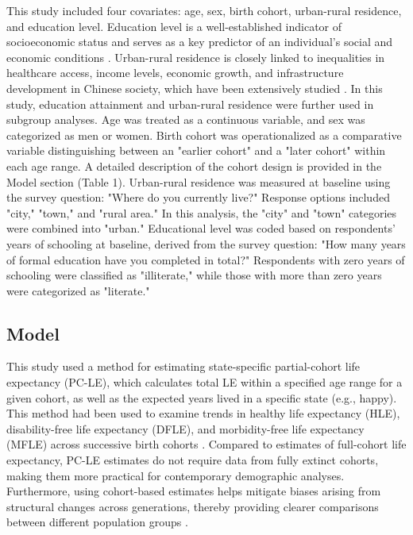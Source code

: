 \documentclass[12pt, a4paper]{article}
\begin{document}
This study included four covariates: age, sex, birth cohort, urban-rural residence, and education level. Education level is a well-established indicator of socioeconomic status and serves as a key predictor of an individual's social and economic conditions \autocite{kwok.2001.use}. Urban-rural residence is closely linked to inequalities in healthcare access, income levels, economic growth, and infrastructure development in Chinese society, which have been extensively studied \autocite{liu.2019.are}. In this study, education attainment and urban-rural residence were further used in subgroup analyses. Age was treated as a continuous variable, and sex was categorized as men or women. Birth cohort was operationalized as a comparative variable distinguishing between an "earlier cohort" and a "later cohort" within each age range. A detailed description of the cohort design is provided in the Model section (Table 1). Urban-rural residence was measured at baseline using the survey question: "Where do you currently live?" Response options included "city," "town," and "rural area." In this analysis, the "city" and "town" categories were combined into "urban." Educational level was coded based on respondents' years of schooling at baseline, derived from the survey question: "How many years of formal education have you completed in total?" Respondents with zero years of schooling were classified as "illiterate," while those with more than zero years were categorized as "literate."

\subsection{Model}
This study used a method for estimating state-specific partial-cohort life expectancy (PC-LE), which calculates total LE within a specified age range for a given cohort, as well as the expected years lived in a specific state (e.g., happy). This method had been used to examine trends in healthy life expectancy (HLE), disability-free life expectancy (DFLE), and morbidity-free life expectancy (MFLE) across successive birth cohorts \autocite{liu.2019.are,payne.2022.expansion,payne.2019.expansion,shen.2023.disability}. Compared to estimates of full-cohort life expectancy, PC-LE estimates do not require data from fully extinct cohorts, making them more practical for contemporary demographic analyses. Furthermore, using cohort-based estimates helps mitigate biases arising from structural changes across generations, thereby providing clearer comparisons between different population groups \autocite{payne.2022.expansion}.
\end{document}

